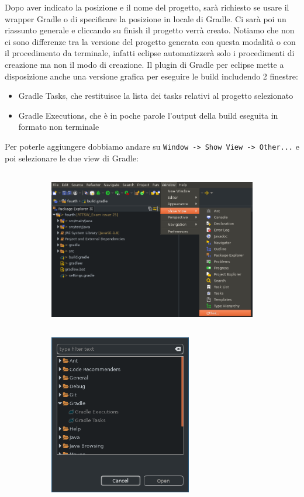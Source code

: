 Dopo aver indicato la posizione e il nome del progetto, sarà richiesto se usare il wrapper Gradle o di specificare la posizione in locale di Gradle. Ci sarà poi un riassunto generale e cliccando su finish il progetto verrà creato. Notiamo che non ci sono differenze tra la versione del progetto generata con questa modalità o con il procedimento da terminale, infatti eclipse automatizzerà solo i procedimenti di creazione ma non il modo di creazione. Il plugin di Gradle per eclipse mette a disposizione anche una versione grafica per eseguire le build includendo 2 finestre:
\begin{itemize}
    \item Gradle Tasks, che restituisce la lista dei tasks relativi al progetto selezionato
    \item Gradle Executions, che è in poche parole l'output della build eseguita in formato non terminale
\end{itemize}
Per poterle aggiungere dobbiamo andare su \texttt{Window -> Show View -> Other...} e poi selezionare le due view di Gradle:
\begin{figure}[H]
\begin{subfigure}{0.6\textwidth}
\includegraphics[width=1.0\linewidth, height=7cm]{3DependencyManagement/eclipsePlugin/openShowView.png}
\end{subfigure}
\begin{subfigure}{0.6\textwidth}
\includegraphics[width=0.6\linewidth, height=7cm]{3DependencyManagement/eclipsePlugin/gradlePluginFeature.png}
\end{subfigure}
\end{figure}
